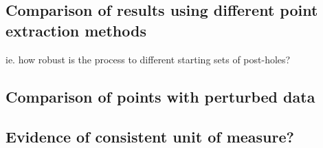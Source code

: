 \documentclass[../../ArchStats.tex]{subfiles}
\begin{document}
\subsection{Comparison of results using different point extraction methods}
ie. how robust is the process to different starting sets of post-holes?

\subsection{Comparison of points with perturbed data}


\subsection{Evidence of consistent unit of measure?}
\end{document}
